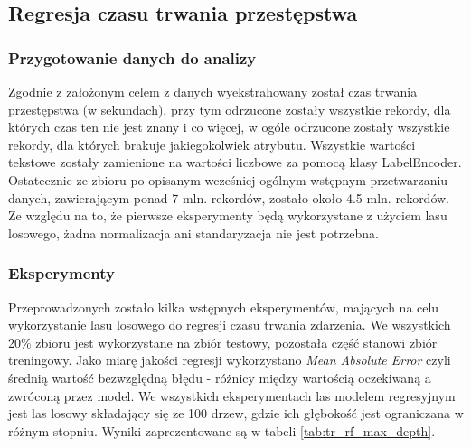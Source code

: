\documentclass{classrep}
\begin{document}
{        \subsection{Regresja czasu trwania przestępstwa} {
            \subsubsection{Przygotowanie danych do analizy} {
                Zgodnie z założonym celem z danych wyekstrahowany został czas trwania przestępstwa (w sekundach), przy tym odrzucone zostały wszystkie rekordy, dla których czas ten nie jest znany i co więcej, w ogóle odrzucone zostały wszystkie rekordy, dla których brakuje jakiegokolwiek atrybutu. Wszystkie wartości tekstowe zostały zamienione na wartości liczbowe za pomocą klasy LabelEncoder. Ostatecznie ze zbioru po opisanym wcześniej ogólnym wstępnym przetwarzaniu danych, zawierającym ponad 7 mln. rekordów, zostało około 4.5 mln. rekordów. Ze względu na to, że pierwsze eksperymenty będą wykorzystane z użyciem lasu losowego, żadna normalizacja ani standaryzacja nie jest potrzebna.
            }
            \subsubsection{Eksperymenty} {
                Przeprowadzonych zostało kilka wstępnych eksperymentów, mających na celu wykorzystanie lasu losowego do regresji czasu trwania zdarzenia. We wszystkich 20\% zbioru jest wykorzystane na zbiór testowy, pozostała część stanowi zbiór treningowy. Jako miarę jakości regresji wykorzystano \emph{Mean Absolute Error} czyli średnią wartość bezwzględną błędu - różnicy między wartością oczekiwaną a zwróconą przez model. We wszystkich eksperymentach las modelem regresyjnym jest las losowy składający się ze 100 drzew, gdzie ich głębokość jest ograniczana w różnym stopniu. Wyniki zaprezentowane są w tabeli \ref{tab:tr_rf_max_depth}.
                
}}}
\end{document}
